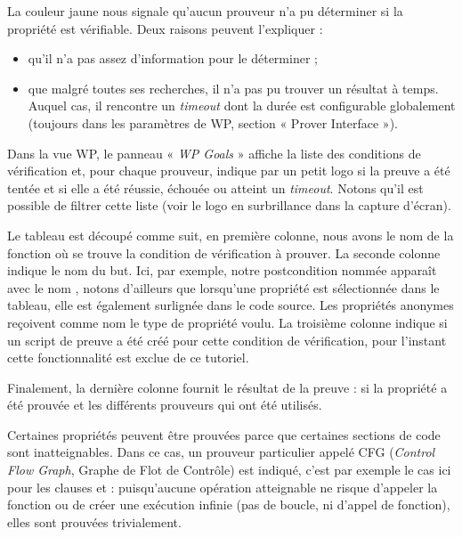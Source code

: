 La couleur jaune nous signale qu'aucun prouveur n'a pu déterminer si la
propriété est vérifiable. Deux raisons peuvent l'expliquer :
\begin{itemize}
\item qu'il n'a pas assez d'information pour le déterminer ;
\item que malgré toutes ses recherches, il n'a pas pu trouver un résultat à
temps. Auquel cas, il rencontre un \textit{timeout} dont la durée est
configurable globalement (toujours dans les paramètres de WP, section
« Prover Interface »).
\end{itemize}


Dans la vue WP, le panneau « \textit{WP Goals} » affiche la liste des
conditions de vérification et, pour chaque prouveur, indique par un petit logo si la
preuve a été tentée et si elle a été réussie, échouée ou atteint un
\textit{timeout}. Notons qu'il est possible de filtrer cette liste (voir le logo
en surbrillance dans la capture d'écran).





Le tableau est découpé comme suit, en première colonne, nous avons le nom de la
fonction où se trouve la condition de vérification à prouver. La seconde colonne indique le nom
du but. Ici, par exemple, notre postcondition nommée apparaît avec le nom
, notons
d'ailleurs que lorsqu'une propriété est sélectionnée dans le tableau, elle
est également surlignée dans le code source. Les propriétés anonymes reçoivent
comme nom le type de propriété voulu. La troisième colonne indique si
un script de preuve a été créé pour cette condition de vérification, pour
l'instant cette fonctionnalité est exclue de ce tutoriel.


Finalement, la dernière colonne fournit le résultat de la preuve : si la
propriété a été prouvée et les différents prouveurs qui ont été utilisés.

Certaines propriétés peuvent être prouvées parce que certaines sections de code
sont inatteignables. Dans ce cas, un prouveur particulier appelé CFG
(\textit{Control Flow Graph}, Graphe de Flot de Contrôle) est indiqué, c'est par
exemple le cas ici pour les clauses  et
 : puisqu'aucune opération atteignable ne risque
d'appeler la fonction  ou de créer une exécution infinie
(pas de boucle, ni d'appel de fonction), elles sont prouvées trivialement.

